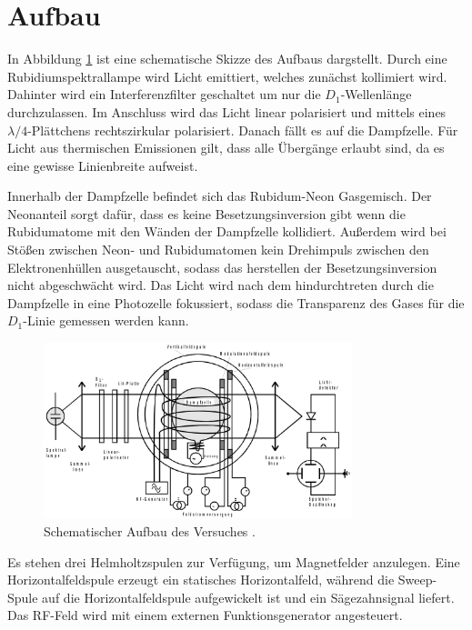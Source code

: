 \section{Aufbau}
\label{sec:Aufbau}

In Abbildung \ref{fig:aufbau} ist eine schematische Skizze des Aufbaus dargstellt.
Durch eine Rubidiumspektrallampe wird Licht emittiert, welches zunächst kollimiert wird.
Dahinter wird ein Interferenzfilter geschaltet um nur die $D_1$-Wellenlänge durchzulassen.
Im Anschluss wird das Licht linear polarisiert und mittels eines $\lambda/4$-Plättchens
rechtszirkular polarisiert. Danach fällt es auf die Dampfzelle.
Für Licht aus thermischen Emissionen gilt, dass alle Übergänge erlaubt sind,
da es eine gewisse Linienbreite aufweist.

Innerhalb der Dampfzelle befindet sich das Rubidum-Neon Gasgemisch. Der Neonanteil sorgt dafür,
dass es keine Besetzungsinversion gibt wenn die Rubidumatome mit den Wänden der Dampfzelle kollidiert.
Außerdem wird bei Stößen zwischen Neon- und Rubidumatomen kein Drehimpuls zwischen den
Elektronenhüllen ausgetauscht, sodass das herstellen der Besetzungsinversion nicht abgeschwächt wird.
Das Licht wird nach dem hindurchtreten durch die Dampfzelle in eine Photozelle fokussiert, sodass die
Transparenz des Gases für die $D_1$-Linie gemessen werden kann.
\begin{figure}
    \centering
    \includegraphics[width=0.8\textwidth]{images/aufbau.png}
    \caption{Schematischer Aufbau des Versuches \cite{anleitung}.}
    \label{fig:aufbau}
\end{figure}

Es stehen drei Helmholtzspulen zur Verfügung, um Magnetfelder anzulegen. Eine Horizontalfeldspule erzeugt ein
statisches Horizontalfeld, während die Sweep-Spule auf die Horizontalfeldspule aufgewickelt ist und ein
Sägezahnsignal liefert. Das RF-Feld wird mit einem externen Funktionsgenerator angesteuert.

